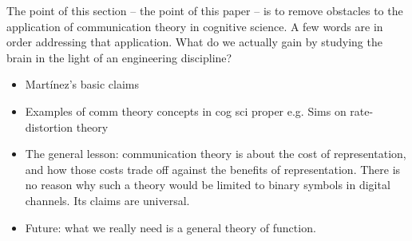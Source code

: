 The point of this section -- the point of this paper -- is to remove obstacles to the application of communication theory in cognitive science.
A few words are in order addressing that application.
What do we actually gain by studying the brain in the light of an engineering discipline?

\begin{itemize}
    \item Mart\'{i}nez's basic claims
    \item Examples of comm theory concepts in cog sci proper e.g. Sims on rate-distortion theory
    \item The general lesson: communication theory is about the cost of representation, and how those costs trade off against the benefits of representation. There is no reason why such a theory would be limited to binary symbols in digital channels. Its claims are universal.
    \item Future: what we really need is a general theory of function.
\end{itemize}
